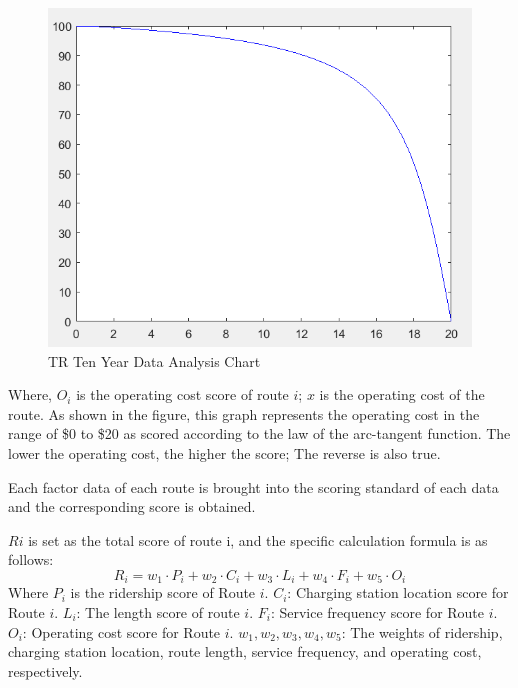 \documentclass[12pt]{article}
\begin{document}
\begin{figure}[H]
	\centering
	\includegraphics[scale=0.7]{data analysis1.png}%
	\caption{TR Ten Year Data Analysis Chart} %
\end{figure}
Where, $O_i$ is the operating cost score of route $i$; $x$ is the operating cost of the route. As shown in the figure, this graph represents the operating 
cost in the range of \$0 to \$20 as scored according to the law of the arc-tangent function. The lower the operating cost, the higher the score; The reverse 
is also true.


Each factor data of each route is brought into the scoring standard of each data and the corresponding score is obtained.


$Ri$ is set as the total score of route i, and the specific calculation formula is as follows:
\begin{equation}
	R_i = w_1 \cdot P_i + w_2 \cdot C_i + w_3 \cdot L_i + w_4 \cdot F_i + w_5 \cdot O_i 
\end{equation}
Where $P_i$ is the ridership score of Route $i$. $C_i$: Charging station location score for Route $i$. $L_i$: 
The length score of route $i$. $F_i$: Service frequency score for Route $i$. $O_i$: Operating cost score for Route $i$. $w_1,w_2,w_3,w_4,w_5$: The weights of ridership, 
charging station location, route length, service frequency, and operating cost, respectively.
\end{document}
